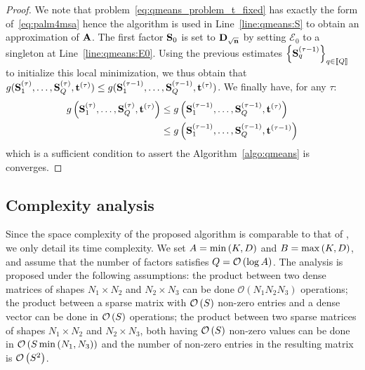 \begin{proof}
We note that  problem~\eqref{eq:qmeans_problem_t_fixed} has exactly the form of~\eqref{eq:palm4msa} hence the \palm algorithm is used in Line~\ref{line:qmeans:S} to obtain an approximation of ${\mathbf{A}}$. The first factor ${\mathbf{S}}_0$ is set to ${\mathbf{D}}_{\sqrt{{\mathbf{n}}}}$ by setting $\mathcal{E}_0$ to a singleton at Line~\ref{line:qmeans:E0}. Using the previous estimates $\left \lbrace {\mathbf{S}}_q^{(\tau-1)}\right \rbrace_{q\in\left \llbracket Q\right \rrbracket}$ to initialize this local minimization, we thus obtain that $g({\mathbf{S}}_1^{(\tau)}, \ldots,{\mathbf{S}}_Q^{(\tau)}, {\mathbf{t}}^{(\tau)}) \leq g({\mathbf{S}}_1^{(\tau-1)}, \ldots,{\mathbf{S}}_Q^{(\tau-1)}, {\mathbf{t}}^{(\tau)})$.
We finally have, for any $\tau$:
\begin{align*}
g\left ({\mathbf{S}}_1^{(\tau)}, \ldots,{\mathbf{S}}_Q^{(\tau)}, {\mathbf{t}}^{(\tau)}\right ) & \leq g\left ({\mathbf{S}}_1^{(\tau-1)}, \ldots,{\mathbf{S}}_Q^{(\tau-1)}, {\mathbf{t}}^{(\tau)}\right ) \\
& \leq g\left ({\mathbf{S}}_1^{(\tau-1)}, \ldots,{\mathbf{S}}_Q^{(\tau-1)}, {\mathbf{t}}^{(\tau-1)}\right ) 
\end{align*}
which is a sufficient condition to assert the Algorithm~\ref{algo:qmeans} is converges.

\end{proof}


\subsection{Complexity analysis}
\label{sec:qkmeans:complexity}

Since the space complexity of the proposed \qkmeans algorithm is comparable to that of \kmeans, we only detail its time complexity. We set $A=\min\left (K, D\right )$ and $B=\max\left (K, D\right )$, and assume that the number of factors satisfies $Q=\mathcal{O}\left(\log A\right)$.
The analysis is proposed under the following assumptions: the product between two dense matrices of shapes ${N_1\times N_2}$ and ${N_2\times N_3}$ can be done $\mathcal{O}\left (N_1 N_2 N_3 \right )$ operations; 
the product between a sparse matrix with $\mathcal{O}\left(S\right)$ non-zero entries and a dense vector can be done in $\mathcal{O}\left(S\right)$ operations; 
the product between two sparse matrices of shapes ${N_1\times N_2}$ and ${N_2\times N_3}$, both having $\mathcal{O}\left(S\right)$ non-zero values can be done in $\mathcal{O}\left(S \min\left (N_1, N_3\right )\right)$ and the number of non-zero entries in the resulting matrix is $\mathcal{O}\left(S^2\right)$.


